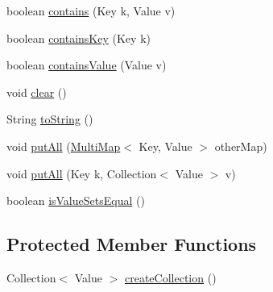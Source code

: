 \begin{DoxyCompactItemize}
boolean \hyperlink{classorg_1_1semanticweb_1_1owlapi_1_1util_1_1_multi_map_3_01_key_00_01_value_01_4_a40bdc392879448679793ca85d48536c1}{contains} (Key k, Value v)
\item 
boolean \hyperlink{classorg_1_1semanticweb_1_1owlapi_1_1util_1_1_multi_map_3_01_key_00_01_value_01_4_ac42b7481f198626ec1b51394a951b2e9}{contains\-Key} (Key k)
\item 
boolean \hyperlink{classorg_1_1semanticweb_1_1owlapi_1_1util_1_1_multi_map_3_01_key_00_01_value_01_4_ad62096e3bd0c6be4542bbdb2081cbf96}{contains\-Value} (Value v)
\item 
void \hyperlink{classorg_1_1semanticweb_1_1owlapi_1_1util_1_1_multi_map_3_01_key_00_01_value_01_4_a66e3a900eec4fa573a8eab8e7d6bc8ed}{clear} ()
\item 
String \hyperlink{classorg_1_1semanticweb_1_1owlapi_1_1util_1_1_multi_map_3_01_key_00_01_value_01_4_a3f6cb177586bca129c407006a49bca6f}{to\-String} ()
\item 
void \hyperlink{classorg_1_1semanticweb_1_1owlapi_1_1util_1_1_multi_map_3_01_key_00_01_value_01_4_a794d98898728f0ace2ff6c8fe1556596}{put\-All} (\hyperlink{classorg_1_1semanticweb_1_1owlapi_1_1util_1_1_multi_map_3_01_key_00_01_value_01_4_a5a881ad106278842d8bd6cfbf7146cdf}{Multi\-Map}$<$ Key, Value $>$ other\-Map)
\item 
void \hyperlink{classorg_1_1semanticweb_1_1owlapi_1_1util_1_1_multi_map_3_01_key_00_01_value_01_4_aaa6c5f949b7e04c28cd2f338f2042caa}{put\-All} (Key k, Collection$<$ Value $>$ v)
\item 
boolean \hyperlink{classorg_1_1semanticweb_1_1owlapi_1_1util_1_1_multi_map_3_01_key_00_01_value_01_4_a526719d69943f817698d8cb2bac1f9e3}{is\-Value\-Sets\-Equal} ()
\end{DoxyCompactItemize}
\subsection*{Protected Member Functions}
\begin{DoxyCompactItemize}
\item 
Collection$<$ Value $>$ \hyperlink{classorg_1_1semanticweb_1_1owlapi_1_1util_1_1_multi_map_3_01_key_00_01_value_01_4_a5ef25a2bc76f0f161b25e23b45702b20}{create\-Collection} ()
\end{DoxyCompactItemize}
